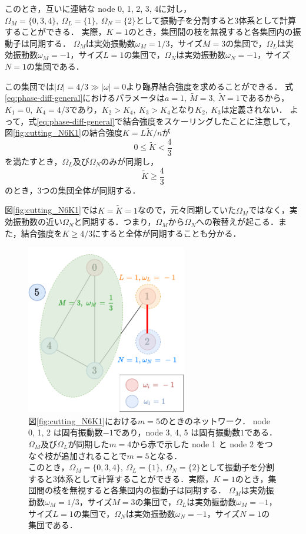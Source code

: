 \documentclass[../main]{subfiles}
\begin{document}
このとき，互いに連結な node 0, 1, 2, 3, 4に対し，$\Omega_M=\{0,3,4\},\ \Omega_L=\{1\},\ \Omega_N=\{2\}$として振動子を分割すると3体系として計算することができる．
実際，$K=1$のとき，集団間の枝を無視すると各集団内の振動子は同期する．
$\Omega_M$は実効振動数$\omega_M=1/3$，サイズ$M=3$の集団で，$\Omega_L$は実効振動数$\omega_M=-1$，サイズ$L=1$の集団で，$\Omega_N$は実効振動数$\omega_N=-1$，サイズ$N=1$の集団である．

この集団では$|\Omega|=4/3\gg|\omega|=0$より臨界結合強度を求めることができる．
式\eqref{eq:phase-diff-general}におけるパラメータは$a=1,\ \tilde{M}=3,\ \tilde{N}=1$であるから，
$K_1=0,\ K_4=4/3$であり，$K_2>K_4,\ K_3>K_4$となり$K_2,\ K_3$は定義されない．
よって，式\eqref{eq:phase-diff-general}で結合強度をスケーリングしたことに注意して，図\ref{fig:cutting_N6K1}の結合強度$K=L\tilde{K}/n$が
\begin{equation*}
    0\leq \tilde{K}<\frac{4}{3}
\end{equation*}
を満たすとき，$\Omega_L$及び$\Omega_N$のみが同期し，
\begin{equation*}
    \tilde{K}\geq \frac{4}{3}
\end{equation*}
のとき，3つの集団全体が同期する．

図\ref{fig:cutting_N6K1}では$K=\tilde{K}=1$なので，元々同期していた$\Omega_M$ではなく，実効振動数の近い$\Omega_N$と同期する．つまり，$\Omega_M$から$\Omega_N$への鞍替えが起こる．また，結合強度を$K\geq 4/3$にすると全体が同期することも分かる．

\begin{figure}[tbp]
\centering
\includegraphics[width=70mm]{images/cutting_N6_drawio.pdf}
\centering
\caption{図\ref{fig:cutting_N6K1}における$m=5$のときのネットワーク．
node 0, 1, 2 は固有振動数$-1$であり，node 3, 4, 5 は固有振動数$1$である．$\Omega_M$及び$\Omega_L$が同期した$m=4$から赤で示した node 1 と node 2 をつなぐ枝が追加されることで$m=5$となる．\\
このとき，$\Omega_M=\{0,3,4\},\ \Omega_L=\{1\},\ \Omega_N=\{2\}$として振動子を分割すると3体系として計算することができる．実際，$K=1$のとき，集団間の枝を無視すると各集団内の振動子は同期する．
$\Omega_M$は実効振動数$\omega_M=1/3$，サイズ$M=3$の集団で，$\Omega_L$は実効振動数$\omega_M=-1$，サイズ$L=1$の集団で，$\Omega_N$は実効振動数$\omega_N=-1$，サイズ$N=1$の集団である．}
\label{fig:cutting_N6-m5}
\end{figure}
\end{document}
